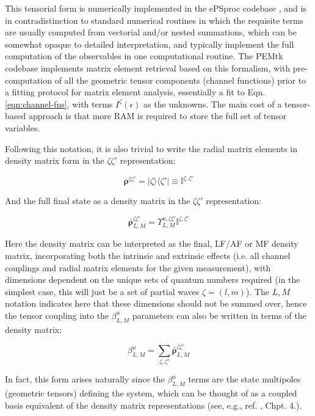This tensorial form is numerically implemented in the ePSproc codebase \cite{ePSprocGithub}, and is in contradistinction to standard numerical routines in which the requisite terms are usually computed from vectorial and/or nested summations, which can be somewhat opaque to detailed interpretation, and typically implement the full computation of the observables in one computational routine. The PEMtk codebase \cite{hockett2021PhotoelectronMetrologyToolkit} implements matrix element retrieval based on this formalism, with pre-computation of all the geometric tensor components (channel functions) prior to a fitting protocol for matrix element analysis, essentially a fit to Eqn. \ref{eqn:channel-fns}, with terms $I^{\zeta}(\epsilon)$ as the unknowns. The main cost of a tensor-based approach is that more RAM is required to store the full set of tensor variables.

Following this notation, it is also trivial to write the radial matrix elements in density matrix form in the $\zeta\zeta'$ representation:

\begin{equation}
\mathbf{\rho}^{\zeta\zeta'} = |\zeta\rangle\langle\zeta'| \equiv \mathbb{I}^{\zeta,\zeta'}
\end{equation}

And the full final state as a density matrix in the $\zeta\zeta'$ representation:

\begin{equation}
\mathbf{\bar{\rho}}_{L,M}^{\zeta\zeta'}=\varUpsilon_{L,M}^{u,\zeta\zeta'}\mathbb{I}^{\zeta,\zeta'}
\end{equation}

Here the density matrix can be interpreted as the final, LF/AF or
MF density matrix, incorporating both the intrinsic and extrinsic
effects (i.e. all channel couplings and radial matrix elements for
the given measurement), with dimensions dependent on the unique sets of quantum numbers required (in the simplest case, this will just be a set of partial waves $\zeta = (l,m)$). The $L,M$ notation indicates here that these dimensions should not be summed over, hence the tensor coupling into the $\beta_{L,M}^{u}$ parameters can also be written in terms of the density matrix:

\begin{equation}
\beta_{L,M}^{u}=\sum_{\zeta,\zeta'}\mathbf{\bar{\rho}}_{L,M}^{\zeta\zeta'}
\end{equation}

In fact, this form arises naturally since the $\beta_{L,M}^{u}$ terms are the state multipoles (geometric tensors) defining the system, which can be thought of as a coupled basis equivalent of the density matrix representations (see, e.g., ref. \cite{BlumDensityMat}, Chpt. 4.).

